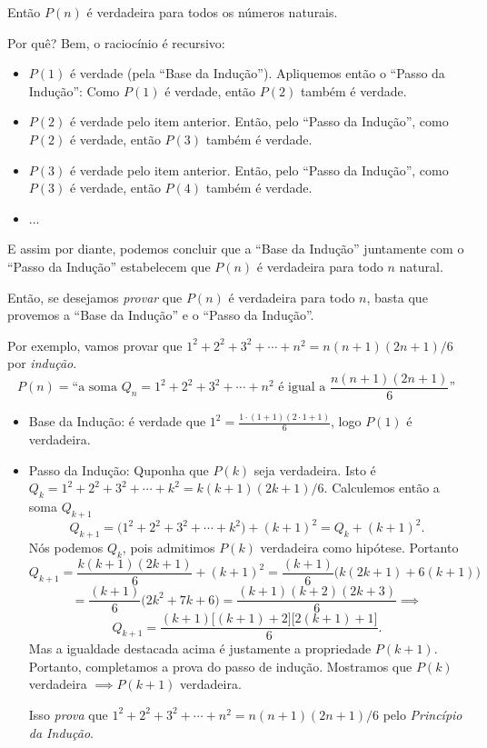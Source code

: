 \documentclass[a4paper,fleqn,12pt]{article}
\begin{document}
Então $P(n)$ é verdadeira para todos os números naturais.

\n\n

Por quê? Bem, o raciocínio é recursivo:
\begin{itemize}
\item $P(1)$ é verdade (pela ``Base da Indução''). Apliquemos então o ``Passo da Indução'': Como $P(1)$ é verdade, então $P(2)$ também é verdade.
\item $P(2)$ é verdade pelo item anterior. Então, pelo ``Passo da Indução'', como $P(2)$ é verdade, então $P(3)$ também é verdade.
\item $P(3)$ é verdade pelo item anterior. Então, pelo ``Passo da Indução'', como $P(3)$ é verdade, então $P(4)$ também é verdade.
\item ...
\end{itemize}

E assim por diante, podemos concluir que a ``Base da Indução'' juntamente com o ``Passo da Indução'' estabelecem que $P(n)$ é verdadeira para todo $n$ natural.

\n

Então, se desejamos \textit{provar} que $P(n)$ é verdadeira para todo $n$, basta que provemos a ``Base da Indução'' e o ``Passo da Indução''.

\n\n

Por exemplo, vamos provar que $1^2 + 2^2 + 3^2 + \cdots + n^2 = n(n+1)(2n+1)/6$ por \textit{indução}.
$$
P(n) = \text{``a soma }Q_n = 1^2 + 2^2 + 3^2 + \cdots + n^2 \text{ é igual a }\frac{n(n+1)(2n+1)}{6}\text{''}
$$

\begin{itemize}
\item Base da Indução: é verdade que $1^2 = \frac{1 \cdot (1 + 1) (2 \cdot 1 + 1)}{6}$, logo $P(1)$ é verdadeira.
\item Passo da Indução: Quponha que $P(k)$ seja verdadeira. Isto é $Q_k = 1^2 + 2^2 + 3^2 + \cdots + k^2 = k(k+1)(2k+1)/6$. Calculemos então a soma $Q_{k+1}$
$$
Q_{k+1} = \Big( 1^2 + 2^2 + 3^2 + \cdots + k^2 \Big) + (k+1)^2 = Q_k + (k+1)^2.
$$
Nós podemos $Q_k$, pois admitimos $P(k)$ verdadeira como hipótese. Portanto
$$
Q_{k+1} = \frac{k(k+1)(2k+1)}{6} + (k+1)^2 = \frac{(k+1)}{6} \Big( k(2k+1) + 6(k+1) \Big)
$$
$$
= \frac{(k+1)}{6} \Big( 2k^2 + 7k + 6 \Big) = \frac{(k+1)(k+2)(2k+3)}{6} \implies
$$
$$
\boxed{ Q_{k+1} = \frac{(k+1)\big[(k+1)+2\big]\big[2(k+1)+1\big]}{6}. }
$$
Mas a igualdade destacada acima é justamente a propriedade $P(k+1)$. Portanto, completamos a prova do passo de indução. Mostramos que $P(k)$ verdadeira $\implies P(k+1)$ verdadeira.

Isso \textit{prova} que $1^2 + 2^2 + 3^2 + \cdots + n^2 = n(n+1)(2n+1)/6$ pelo \textit{Princípio da Indução}.
\end{itemize}
\end{document}
